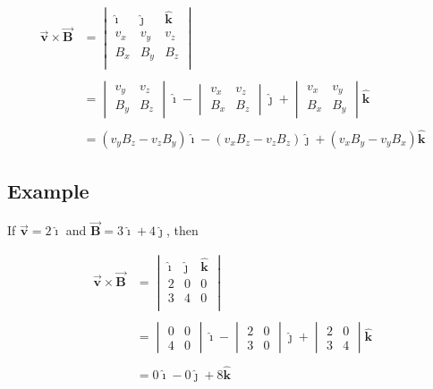 \documentclass{article}
\newcommand{\ihat}[0]{\hat{\boldsymbol{\imath}}}
\newcommand{\jhat}[0]{\hat{\boldsymbol{\jmath}}}
\newcommand{\khat}[0]{\hat{\boldsymbol{k}}}
\newcommand{\bfvec}[1]{\vec{\mathbf{#1}}}
\begin{document}
$$
\begin{align*}
\bfvec{v}\times\bfvec{B}
&=
\begin{vmatrix}
\ihat&\jhat&\khat\\
v_x&v_y&v_z\\
B_x&B_y&B_z\\
\end{vmatrix}
\\\\ &=
\begin{vmatrix}
v_y & v_z \\
B_y & B_z 
\end{vmatrix} \ihat - \begin{vmatrix}
v_x & v_z \\
B_x & B_z 
\end{vmatrix} \jhat +  \begin{vmatrix}
v_x & v_y \\
B_x & B_y 
\end{vmatrix} \khat
\\\\ &=
(v_yB_z - v_zB_y)\ihat -(v_xB_z - v_zB_z)\jhat +(v_xB_y - v_yB_x)\khat
\end{align*}
$$

\subsection{Example}

If $\bfvec{v}=2\ihat$ and $\bfvec{B}=3\ihat+4\jhat$, then

$$
\begin{align*}
\bfvec{v}\times\bfvec{B}
&=
\begin{vmatrix}
\ihat&\jhat&\khat\\
2&0&0\\
3&4&0\\
\end{vmatrix}
\\\\ &=
\begin{vmatrix}
0 & 0 \\
4 & 0 
\end{vmatrix} \ihat - \begin{vmatrix}
2 & 0 \\
3 & 0 
\end{vmatrix} \jhat +  \begin{vmatrix}
2 & 0 \\
3 & 4 
\end{vmatrix} \khat
\\\\ &=
0\ihat - 0\jhat + 8\khat
\end{align*}
$$
\end{document}
